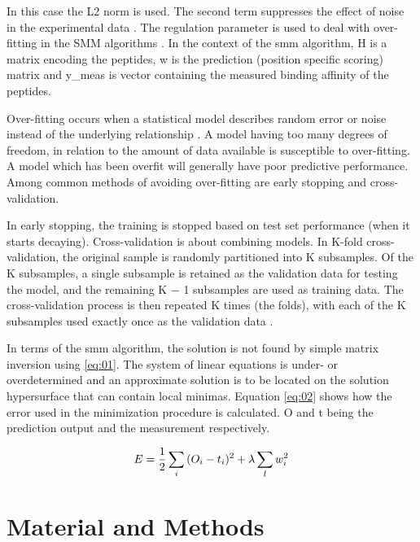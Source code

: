 \documentclass{bioinfo}
\begin{document}
\begin{application}
In this case the L2 norm is used. The second term suppresses the effect of noise in the experimental data \cite{SMM}. The regulation parameter \lambda is used to deal with over-fitting in the SMM algorithms \cite{wiki:overfit}. In the context of the smm algorithm, H is a matrix encoding the peptides, w is the prediction (position specific scoring) matrix and y_{meas} is vector containing the measured binding affinity of the peptides.
\par Over-fitting occurs when a statistical model describes random error or noise instead of the underlying relationship \cite{Hobohm}. A model having too many degrees of freedom, in relation to the amount of data available is susceptible to over-fitting. A model which has been overfit will generally have poor predictive performance. Among common methods of avoiding over-fitting are early stopping and cross-validation.
\par In early stopping, the training is stopped based on test set performance (when it starts decaying). Cross-validation is about combining models. In K-fold cross-validation, the original sample is randomly partitioned into K subsamples. Of the K subsamples, a single subsample is retained as the validation data for testing the model, and the remaining K − 1 subsamples are used as training data. The cross-validation process is then repeated K times (the folds), with each of the K subsamples used exactly once as the validation data \cite{wiki:crossval}.
\par In terms of the smm algorithm, the solution is not found by simple matrix inversion using \ref{eq:01}. The system of linear equations is under- or overdetermined and an approximate solution is to be located on the solution hypersurface that can contain local minimas. Equation \ref{eq:02} shows how the error used in the minimization procedure is calculated. O and t being the prediction output and the measurement respectively.

\begin{equation}
\label{eq:general}
E = \frac{1}{2} \sum_i{(O_i-t_i)^2} + \lambda \sum_l{w_i^2} \\
\end{equation}


\section*{Material and Methods}


\end{application}
\end{document}
